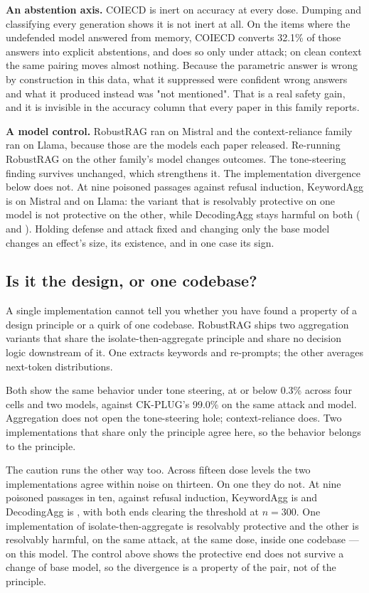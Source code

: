 \textbf{An abstention axis.} COIECD is inert on accuracy at every dose. Dumping
and classifying every generation shows it is not inert at all. On the items
where the undefended model answered from memory, COIECD converts
32.1\% of those answers into explicit abstentions, and does so only
under attack; on clean context the same pairing moves almost nothing. Because
the parametric answer is wrong by construction in this data, what it suppressed
were confident wrong answers and what it produced instead was "not mentioned".
That is a real safety gain, and it is invisible in the accuracy column that
every paper in this family reports.

\textbf{A model control.} RobustRAG ran on Mistral and the
context-reliance family ran on Llama, because those are the models each
paper released. Re-running RobustRAG on the other family's model changes
outcomes. The tone-steering finding survives unchanged, which strengthens
it. The implementation divergence below does not. At nine poisoned passages
against refusal induction, KeywordAgg is \NKeywordNineMistral{}\pp{} on
Mistral and \NKeywordNineLlama{}\pp{} on Llama: the variant that is
resolvably protective on one model is not protective on the other, while
DecodingAgg stays harmful on both (\NDecodingNineMistral{}\pp{} and
\NDecodingNineLlama{}\pp{}). Holding defense and attack fixed and changing
only the base model changes an effect's size, its existence, and in one case
its sign.

\subsection{Is it the design, or one codebase?}

A single implementation cannot tell you whether you have found a property of a
design principle or a quirk of one codebase. RobustRAG
ships two aggregation variants that share the isolate-then-aggregate principle
and share no decision logic downstream of it. One extracts keywords and
re-prompts; the other averages next-token distributions.

Both show the same behavior under tone steering, at or below 0.3\% across
four cells and two models, against CK-PLUG's 99.0\% on the same attack and
model. Aggregation does not open the tone-steering hole; context-reliance
does. Two implementations that share only the principle agree here, so the
behavior belongs to the principle.

The caution runs the other way too. Across fifteen dose levels the two
implementations agree within noise on thirteen. On one they do not. At nine
poisoned passages in ten, against refusal induction, KeywordAgg is
\NKeywordNineMistral{}\pp{} and DecodingAgg is
\NDecodingNineMistral{}\pp{}, with both ends clearing the \ERobustMdr\pp
threshold at $n=300$. One implementation of isolate-then-aggregate is
resolvably protective and the other is resolvably harmful, on the same
attack, at the same dose, inside one codebase --- on this model. The control
above shows the protective end does not survive a change of base model, so
the divergence is a property of the pair, not of the principle.

